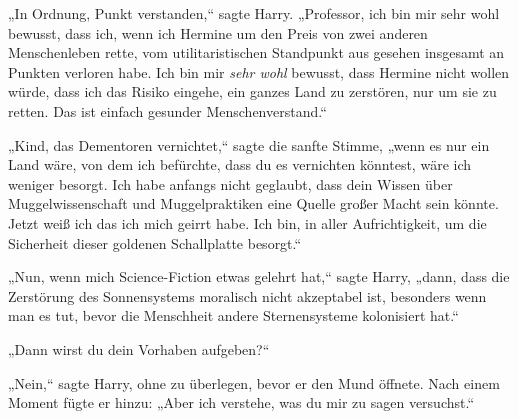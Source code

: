 „In Ordnung, Punkt verstanden,“ sagte Harry. „Professor, ich bin mir sehr wohl bewusst, dass ich, wenn ich Hermine um den Preis von zwei anderen Menschenleben rette, vom utilitaristischen Standpunkt aus gesehen insgesamt an Punkten verloren habe. Ich bin mir \emph{sehr wohl} bewusst, dass Hermine nicht wollen würde, dass ich das Risiko eingehe, ein ganzes Land zu zerstören, nur um sie zu retten. Das ist einfach gesunder Menschenverstand.“

„Kind, das Dementoren vernichtet,“ sagte die sanfte Stimme, „wenn es nur ein Land wäre, von dem ich befürchte, dass du es vernichten könntest, wäre ich weniger besorgt. Ich habe anfangs nicht geglaubt, dass dein Wissen über Muggelwissenschaft und Muggelpraktiken eine Quelle großer Macht sein könnte. Jetzt weiß ich das ich mich geirrt habe. Ich bin, in aller Aufrichtigkeit, um die Sicherheit dieser goldenen Schallplatte besorgt.“

„Nun, wenn mich Science-Fiction etwas gelehrt hat,“ sagte Harry, „dann, dass die Zerstörung des Sonnensystems moralisch nicht akzeptabel ist, besonders wenn man es tut, bevor die Menschheit andere Sternensysteme kolonisiert hat.“

„Dann wirst du dein Vorhaben aufgeben?“

„Nein,“ sagte Harry, ohne zu überlegen, bevor er den Mund öffnete. Nach einem Moment fügte er hinzu: „Aber ich verstehe, was du mir zu sagen versuchst.“


